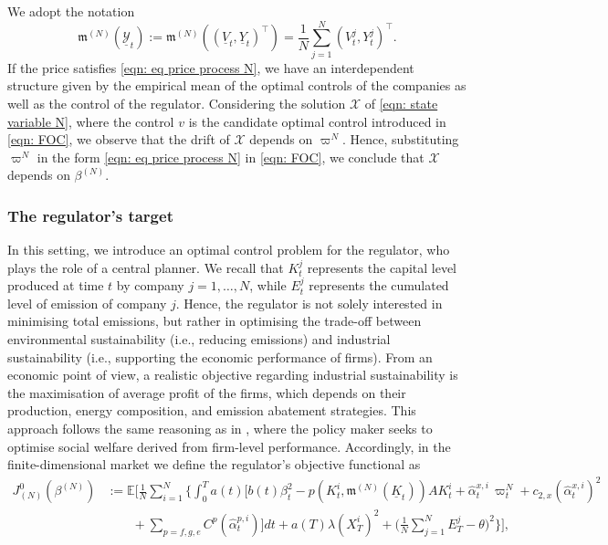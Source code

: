 \documentclass[11pt,twoside]{amsart}
\theoremstyle{definition}
\numberwithin{equation}{section}
\newcommand{\w}{\varpi}
\newcommand{\E}{\mathbb{E}}
\renewcommand{\hat}{\widehat}
\newcommand{\avg}{\frac{1}{N}\sum_{j = 1}^N}
\begin{document}
We adopt the notation 
\begin{equation*}
\mathfrak{m}^{(N)}(\underline{\mathcal{Y}}_t) := \mathfrak{m}^{(N)}((\underline{V}_t,\underline{Y}_t)^\top) =\frac{1}{N} \sum_{j = 1}^N (V^j_t,Y^j_t)^\top.
\end{equation*}
If the price satisfies \eqref{eqn: eq price process N}, we have an interdependent structure given by the empirical mean of the optimal controls of the companies as well as the control of the regulator. Considering the solution $\mathcal{X}$ of \eqref{eqn: state variable N}, where the control $v$ is the candidate optimal control introduced in \eqref{eqn: FOC}, we observe that the drift of $\mathcal{X}$ depends on $\w^N$. Hence, substituting $\w^N$ in the form \eqref{eqn: eq price process N} in \eqref{eqn: FOC}, we conclude that $\mathcal{X}$ depends on $\beta^{(N)}$. 



\subsubsection{The regulator's target}

In this setting, we introduce an optimal control problem for the regulator, who plays the role of a central planner. We recall that $K^j_t$ represents the capital level produced at time $t$ by company $j = 1,\dots,N$, while $E^j_t$ represents the cumulated level of emission of company $j$. Hence, the regulator is not solely interested in minimising total emissions, but rather in optimising the trade-off between environmental sustainability (i.e., reducing emissions) and industrial sustainability (i.e., supporting the economic performance of firms). 
From an economic point of view, a realistic objective regarding industrial sustainability is the maximisation of average profit of the firms, which depends on their production, energy composition, and emission abatement strategies. This approach follows the same reasoning as in \cite[equation (8)]{aid2023optimal}, where the policy maker seeks to optimise social welfare derived from firm-level performance. Accordingly, in the finite-dimensional market we define the regulator’s objective functional as
\begin{align}
\label{eqn: target-reg-N}
    J^0_{(N)}(\beta^{(N)})
    & :=\E\Bigg[\frac{1}{N}\sum_{i = 1}^N \Bigg\{ \int_0^T a(t)\bigg[
    b(t)\beta_t^2-p(K^i_t, \mathfrak{m}^{(N)}(\underline{K}_t)) A K^i_t 
    + \hat{\alpha}^{x,i}_t \, \w^N_t + c_{2,x}(\hat{\alpha}^{x,i}_t)^2 
     \\
    \nonumber&\qquad
    + \sum_{p = f,g,e} C^p(\hat{\alpha}^{p,i}_t)
    \bigg] dt+ a(T)\lambda (X^i_T)^2 + \Bigg( \avg E^j_T - \theta\Bigg)^2 \Bigg\} \Bigg],
\end{align}
\end{document}
